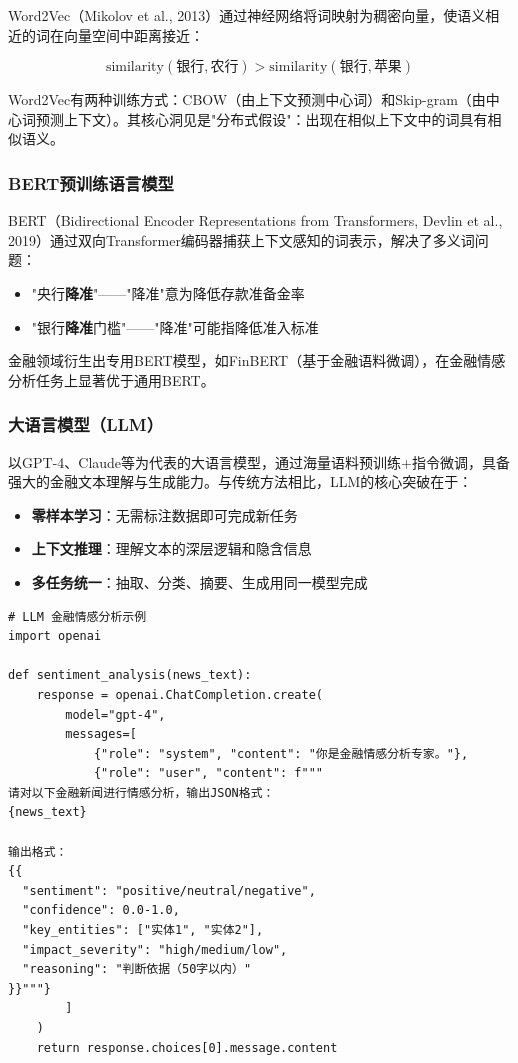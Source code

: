 Word2Vec（Mikolov et al., 2013）通过神经网络将词映射为稠密向量，使语义相近的词在向量空间中距离接近：

\[
\text{similarity}(\text{银行}, \text{农行}) > \text{similarity}(\text{银行}, \text{苹果})
\]

Word2Vec有两种训练方式：CBOW（由上下文预测中心词）和Skip-gram（由中心词预测上下文）。其核心洞见是"分布式假设"：出现在相似上下文中的词具有相似语义。

\subsubsection{BERT预训练语言模型}

BERT（Bidirectional Encoder Representations from Transformers, Devlin et al., 2019）通过双向Transformer编码器捕获上下文感知的词表示，解决了多义词问题：

\begin{itemize}[leftmargin=2em]
  \item "央行\textbf{降准}"——"降准"意为降低存款准备金率
  \item "银行\textbf{降准}门槛"——"降准"可能指降低准入标准
\end{itemize}

金融领域衍生出专用BERT模型，如FinBERT（基于金融语料微调），在金融情感分析任务上显著优于通用BERT。

\subsubsection{大语言模型（LLM）}

以GPT-4、Claude等为代表的大语言模型，通过海量语料预训练+指令微调，具备强大的金融文本理解与生成能力。与传统方法相比，LLM的核心突破在于：

\begin{itemize}[leftmargin=2em]
  \item \textbf{零样本学习}：无需标注数据即可完成新任务
  \item \textbf{上下文推理}：理解文本的深层逻辑和隐含信息
  \item \textbf{多任务统一}：抽取、分类、摘要、生成用同一模型完成
\end{itemize}

\begin{lstlisting}[style=python]
# LLM 金融情感分析示例
import openai

def sentiment_analysis(news_text):
    response = openai.ChatCompletion.create(
        model="gpt-4",
        messages=[
            {"role": "system", "content": "你是金融情感分析专家。"},
            {"role": "user", "content": f"""
请对以下金融新闻进行情感分析，输出JSON格式：
{news_text}

输出格式：
{{
  "sentiment": "positive/neutral/negative",
  "confidence": 0.0-1.0,
  "key_entities": ["实体1", "实体2"],
  "impact_severity": "high/medium/low",
  "reasoning": "判断依据（50字以内）"
}}"""}
        ]
    )
    return response.choices[0].message.content
\end{lstlisting}

